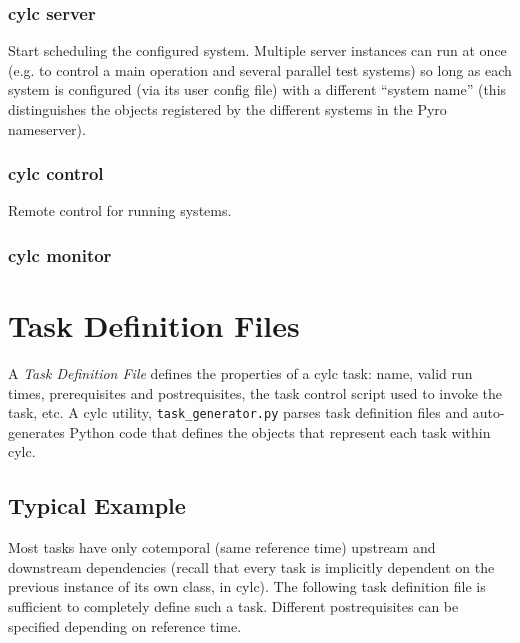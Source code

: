 \documentclass[11pt,a4paper]{article}
\begin{document}
\subsubsection{cylc server}

Start scheduling the configured system. Multiple server instances can run at once
(e.g. to control a main operation and several parallel test systems) so
long as each system is configured (via its user config file) with a
different ``system name'' (this distinguishes the objects registered by
the different systems in the Pyro nameserver).

{
\color{Magenta}

}


\subsubsection{cylc control}

Remote control for running systems.

{
\color{Magenta}

}


\subsubsection{cylc monitor}
{
\color{Magenta}

}

\label{config}
\section{Task Definition Files}

A {\em Task Definition File} defines the properties of a cylc task:
name, valid run times, prerequisites and postrequisites, the task
control script used to invoke the task, etc.  A cylc utility,
\verb=task_generator.py= parses task definition files and auto-generates
Python code that defines the objects that represent each task within
cylc.

\subsection{Typical Example}

Most tasks have only cotemporal (same reference time) upstream and
downstream dependencies (recall that every task is implicitly dependent
on the previous instance of its own class, in cylc). The following
task definition file is sufficient to completely define such a task.
Different postrequisites can be specified depending on reference time. 
\end{document}
